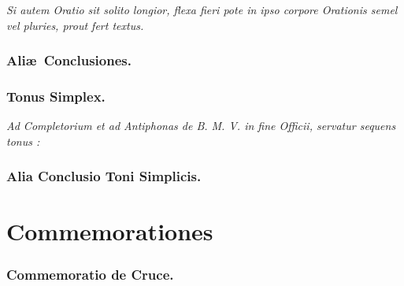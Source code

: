 \documentclass[12pt]{article} %
\newenvironment{rubric}{\color{benred8} \itshape \leftskip 0in \setlength{\parindent}{0.25in}}{\vspace{2 mm}}
\begin{document}

\vspace{1mm}

\begin{rubric}
Si autem Oratio sit solito longior, flexa fieri pote in ipso corpore Orationis semel vel pluries, prout fert textus.

\end{rubric}

\subsubsection*{Ali\ae\ Conclusiones.}


\vspace*{-1.0mm}

\subsubsection*{Tonus Simplex.}

\label{OratioSimplex}

\begin{rubric}
Ad Completorium et ad Antiphonas de B. M. V. in fine Officii, servatur sequens tonus :

\end{rubric}


\subsubsection*{Alia Conclusio Toni Simplicis.}


\newpage


\section*{Commemorationes}
\label{sec:Commem}

\thispagestyle{plain}


\subsubsection*{Commemoratio de Cruce.}
\end{document}
